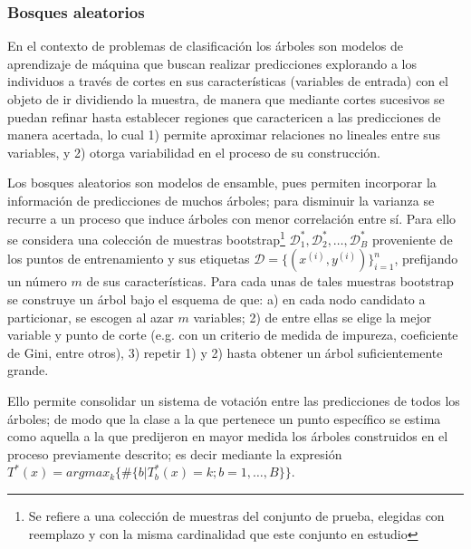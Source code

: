 \documentclass[9pt,twocolumn,twoside]{ilcss}
\begin{document}
\subsubsection{Bosques aleatorios}

En el contexto de problemas de clasificación los árboles son modelos de aprendizaje de máquina que buscan realizar predicciones explorando a los individuos a través de cortes en sus características (variables de entrada) con el objeto de ir dividiendo la muestra, de manera que mediante cortes sucesivos se puedan refinar hasta establecer regiones que caractericen a las predicciones de manera acertada, lo cual 1) permite aproximar relaciones no lineales entre sus variables, y 2) otorga variabilidad en el proceso de su construcción.

Los bosques aleatorios son modelos de ensamble, pues permiten incorporar la información de predicciones de muchos árboles; para disminuir la varianza se recurre a un proceso que induce árboles con menor correlación entre sí. Para ello se considera una colección de muestras bootstrap\footnote{Se refiere a una colección de muestras del conjunto de prueba, elegidas con reemplazo y con la misma cardinalidad que este conjunto en estudio} ${\mathcal D}_1^*, {\mathcal D}_2^*, \ldots, {\mathcal D}_B^*$ proveniente de los puntos de entrenamiento y sus etiquetas ${\mathcal D} =\{(x^{(i)}, y^{(i)})\}_{i=1}^n$, prefijando un número $m$ de sus características. Para cada unas de tales muestras bootstrap se construye un árbol bajo el esquema de que: a)
en cada nodo candidato a particionar, se escogen al azar $m$ variables; 2) de entre ellas se elige la mejor variable y punto de corte (e.g. con un criterio de medida de impureza, coeficiente de Gini, entre otros), 3) repetir 1) y 2) hasta obtener un árbol suficientemente grande.

Ello permite consolidar un sistema de votación entre las predicciones de todos los árboles; de modo que la clase a la que pertenece un punto específico se estima como aquella a la que predijeron en mayor medida los árboles construidos en el proceso previamente descrito; es decir mediante la expresión $T^*(x) = argmax_k \{ \# \{b |T_b^*(x)=k; b=1,\ldots, B\}\}.$
\end{document}
